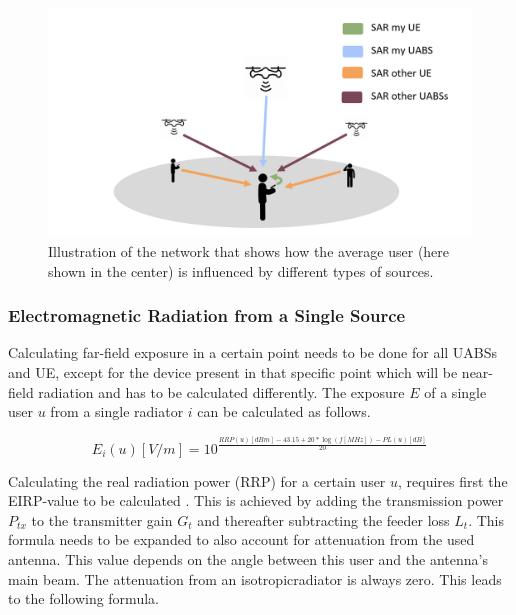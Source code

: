 \documentclass[twocolumn]{phdsymp} %
\begin{document}
\begin{figure}[h!]
\centering
  \includegraphics[width=\linewidth]{networkIllustrationSARSources.png}
  \caption{Illustration of the network that shows how the average user (here shown in the center) is influenced by different types of sources. }
  \label{fig:networkIllustration}
\end{figure}

\subsubsection{Electromagnetic Radiation from a Single Source}
\label{sec:calculatingexposure}

Calculating far-field exposure in a certain point needs to be done for all \gls{UABS}s and UE, except for the device 
present in that specific point which will be near-field radiation and has to be calculated differently.
The exposure $E$ of a single user $u$ from a single radiator $i$ can be calculated
as follows.

\begin{equation}
E_i(u) [V/m] = 10^{\frac{RRP(u)[dBm] - 43.15 + 20*\log(f [MHz])- PL(u) [dB]}{20}}
\label{eq:singleexposure}
\end{equation}

Calculating the real radiation power (RRP) for a certain user $u$, requires first the \gls{EIRP}-value to be calculated  \cite{J6_originalExposureFormula,J1}.
This is achieved by adding the transmission power $P_{tx}$ to the transmitter gain $G_t$ and thereafter subtracting the feeder loss $L_t$.
This formula needs to be expanded to also account for attenuation from the used antenna. This value depends on the angle
between this user and the antenna's main beam. The attenuation from an \gls{isotropicradiator} is always zero. This leads to the following formula.
\end{document}
